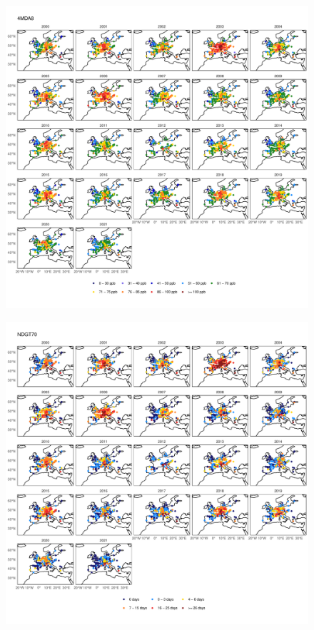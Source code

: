 \documentclass{article}
\begin{document}
\begin{figure}
\centering
\includegraphics[height=0.9\textheight]{figures/si_figures/fS10_metric_map_Europe_4MDA8.pdf}
\caption{}
\label{si_fig:metric_map_eu_4MDA8}
\end{figure}
\clearpage

\begin{figure}
\centering
\includegraphics[height=0.9\textheight]{figures/si_figures/fS11_metric_map_Europe_NDGT70.pdf}
\caption{}
\label{si_fig:metric_map_eu_NDGT70}
\end{figure}
\clearpage
\end{document}
